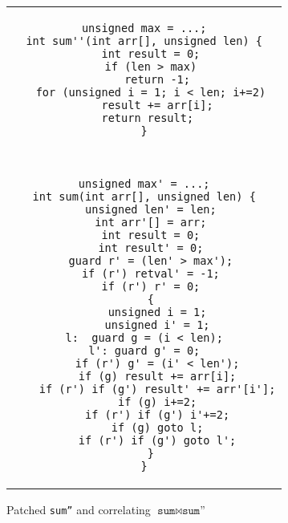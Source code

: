 \begin{figure}
\centering
\begin{tabular}{c}
\begin{lstlisting}
unsigned max = ...;
int sum''(int arr[], unsigned len) {
  int result = 0;
  if (len > max)
    return -1;
  for (unsigned i = 1; i < len; i+=2)
    result += arr[i];
 return result;
}
\end{lstlisting}
\\
\\ \hline
\\
\begin{lstlisting}
unsigned max' = ...;
int sum(int arr[], unsigned len) {
  unsigned len' = len;
  int arr'[] = arr;
  int result = 0;
  int result' = 0;
  guard r' = (len' > max');
  if (r') retval' = -1;
  if (r') r' = 0;
  {
    unsigned i = 1;
    unsigned i' = 1;
l:  guard g = (i < len);
l': guard g' = 0;
    if (r') g' = (i' < len');
    if (g) result += arr[i];
    if (r') if (g') result' += arr'[i'];
    if (g) i+=2;
    if (r') if (g') i'+=2;
    if (g) goto l;
    if (r') if (g') goto l';
  }
}
\end{lstlisting}
\end{tabular}
\caption{Patched \texttt{sum''} and correlating $ \texttt{sum} \bowtie \texttt{sum''}$}
\end{figure} 